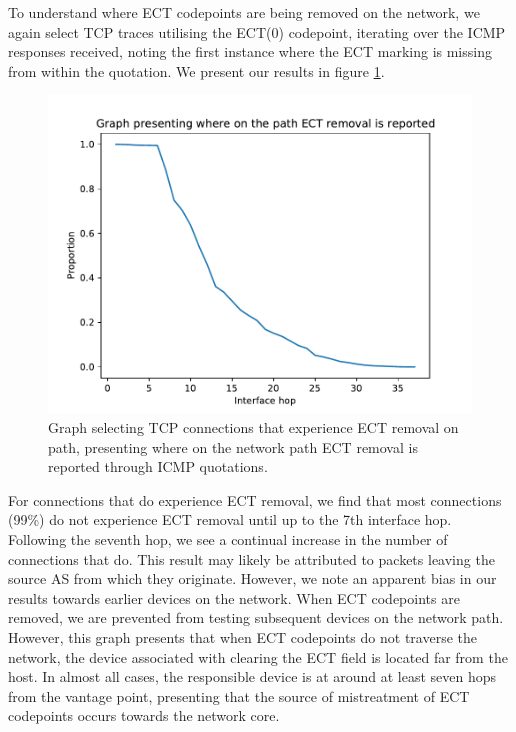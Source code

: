 \documentclass{l4proj}
\begin{document}
To understand where ECT codepoints are being removed on the network, we again select TCP traces utilising the ECT(0) codepoint, iterating over the ICMP responses received, noting the first instance where the ECT marking is missing from within the quotation. We present our results in figure \ref{fig:tcppreserve}.

\begin{figure}[H]
    \centering
    \includegraphics[scale=0.75]{dissertation/images/preservetcp.pdf}
    \caption{Graph selecting TCP connections that experience ECT removal on path, presenting where on the network path ECT removal is reported through ICMP quotations.}
    \label{fig:tcppreserve}
\end{figure}

For connections that do experience ECT removal, we find that most connections (99\%) do not experience ECT removal until up to the 7th interface hop. Following the seventh hop, we see a continual increase in the number of connections that do. This result may likely be attributed to packets leaving the source AS from which they originate. However, we note an apparent bias in our results towards earlier devices on the network. When ECT codepoints are removed, we are prevented from testing subsequent devices on the network path. However, this graph presents that when ECT codepoints do not traverse the network, the device associated with clearing the ECT field is located far from the host. In almost all cases, the responsible device is at around at least seven hops from the vantage point, presenting that the source of mistreatment of ECT codepoints occurs towards the network core.
\end{document}
